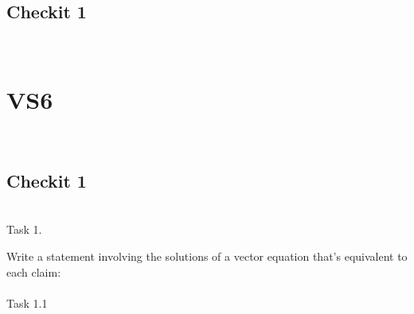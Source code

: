 \documentclass{article}
\begin{document}
\subsection*{Checkit 1}\\

\newpage
\section{VS6}\\
\subsection*{Checkit 1}\\

Task 1.

Write a statement involving the solutions of a vector equation that's equivalent to each claim:\\
\\
Task 1.1\\
\end{document}
